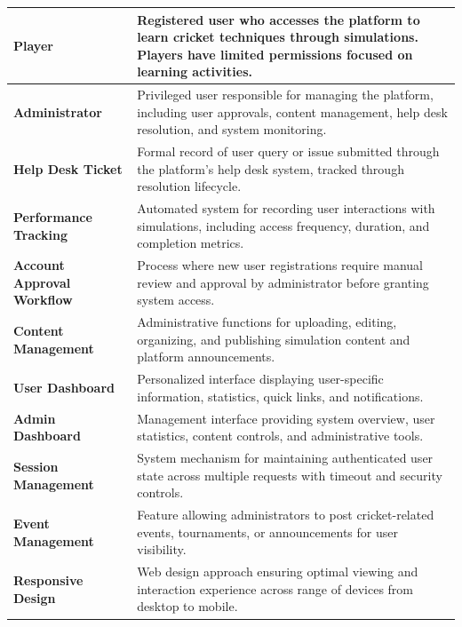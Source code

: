 \documentclass[12pt,a4paper]{article}
\begin{document}
\begin{enumerate}
\begin{longtable}{|p{4cm}|p{10cm}|}
\textbf{Player} & Registered user who accesses the platform to learn cricket techniques through simulations. Players have limited permissions focused on learning activities. \\ \hline

\textbf{Administrator} & Privileged user responsible for managing the platform, including user approvals, content management, help desk resolution, and system monitoring. \\ \hline

\textbf{Help Desk Ticket} & Formal record of user query or issue submitted through the platform's help desk system, tracked through resolution lifecycle. \\ \hline

\textbf{Performance Tracking} & Automated system for recording user interactions with simulations, including access frequency, duration, and completion metrics. \\ \hline

\textbf{Account Approval Workflow} & Process where new user registrations require manual review and approval by administrator before granting system access. \\ \hline

\textbf{Content Management} & Administrative functions for uploading, editing, organizing, and publishing simulation content and platform announcements. \\ \hline

\textbf{User Dashboard} & Personalized interface displaying user-specific information, statistics, quick links, and notifications. \\ \hline

\textbf{Admin Dashboard} & Management interface providing system overview, user statistics, content controls, and administrative tools. \\ \hline

\textbf{Session Management} & System mechanism for maintaining authenticated user state across multiple requests with timeout and security controls. \\ \hline

\textbf{Event Management} & Feature allowing administrators to post cricket-related events, tournaments, or announcements for user visibility. \\ \hline

\textbf{Responsive Design} & Web design approach ensuring optimal viewing and interaction experience across range of devices from desktop to mobile. \\ \hline


\end{longtable}
\end{enumerate}
\end{document}

